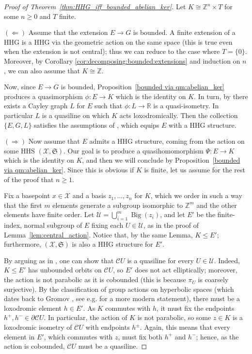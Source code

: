 \documentclass[svgnames]{amsart}
\theoremstyle{plain}
\theoremstyle{definition}
\newcommand{\cal}[1]{\mathcal{#1}}
\newcommand{\Z}{\mathbb{Z}}
\newcommand{\R}{\mathbb{R}}
\newcommand{\frakS}{\mathfrak{S}}
\newcommand{\C}{\cal C}
\newcommand{\Bigdom}[1]{\operatorname{Big}\left(#1\right)}
\begin{document}
\begin{proof}[Proof of Theorem~\ref{thm:HHG_iff_bounded_abelian_ker}]
Let $K \cong\Z^n\times T$ for some $n\ge 0$ and $T$ finite.

$(\Leftarrow)$ Assume that the extension $E \to G$ is bounded. A finite extension of a HHG is a HHG via the geometric action on the same space (this is true even when the extension is not central); thus we can reduce to the case where $T=\{0\}$. Moreover, by Corollary \ref{cor:decomposing:bounded:extensions} and induction on $n$, we can also assume that $K\cong \Z$. 

Now, since $E\to G$ is bounded, Proposition~\ref{bounded via qm:abelian_ker} produces a quasimorphism $\phi\colon E\to K$ which is the identity on $K$. In turn, by \cite[Lemma 4.15]{ABO} there exists a Cayley graph $L$ for $E$ such that $\phi\colon L\to \R$ is a quasi-isometry. In particular $L$ is a quasiline on which $K$ acts loxodromically. Then the collection $\{E,G,L\}$ satisfies the assumptions of \cite[Proposition 5.14]{uniform_undistortion}, which equips $E$ with a HHG structure.

\medskip
$(\Rightarrow)$ Now assume that $E$ admits a HHG structure, coming from the action on some HHS $(\cal X,\frakS)$. Our goal is to produce a quasihomomorphism $\Psi\colon E\to K$ which is the identity on $K$, and then we will conclude by Proposition~\ref{bounded via qm:abelian_ker}. Since this is obvious if $K$ is finite, let us assume for the rest of the proof that $n \geq 1$.

Fix a basepoint $x\in \cal X$ and a basis $z_1,\ldots,z_n$ for $K$, which we order in such a way that the first $m$ elements generate a subgroup isomorphic to $\Z^m$ and the other elements have finite order. Let $\cal U=\bigcup_{i=1}^m\Bigdom{z_i}$, and let $E'$ be the finite-index, normal subgroup of $E$ fixing each $U\in \cal U$, as in the proof of Lemma~\ref{lem:central_action}. Notice that, by the same Lemma, $K\le E'$; furthermore, $(\cal X, \frakS)$ is also a HHG structure for $E'$.

By arguing as in \cite[Lemma 4.20]{ABO}, one can show that $\C U$ is a quasiline for every $U\in \cal U$. Indeed, $K\le E'$ has unbounded orbits on $\C U$, so $E'$ does not act elliptically; moreover, the action is not parabolic as it is cobounded (this is because $\pi_U$ is coarsely surjective). By the classification of group actions on hyperbolic spaces (which dates back to Gromov \cite{gromov}, see e.g. \cite[Theorem 4.2]{ABO} for a more modern statement), there must be a loxodromic element $h\in E'$. As $K$ commutes with $h$, it must fix the endpoints $h^+,h^-\in\partial \C U$. In particular, the action of $K$ is not parabolic, so some $z\in K$ is a loxodromic isometry of $\C U$ with endpoints $h^\pm$. Again, this means that every element in $E'$, which commutes with $z$, must fix both $h^+$ and $h^-$; hence, as the action is cobounded, $\C U$ must be a quasiline. 


\end{proof}
\end{document}

